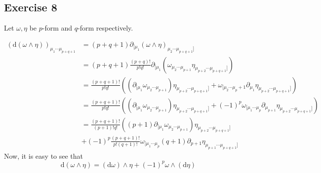 \subsection{Exercise 8}
Let $\omega,\eta$ be $p$-form and $q$-form respectively.

\begin{align}
    (\mathrm{d}(\omega \wedge \eta))_{\mu_1 \cdots \mu_{p+q+1}} &= (p+q+1)\partial_{[\mu_1} (\omega \wedge \eta)_{\mu_2\cdots\mu_{p+q+1}]} \\
    &= (p+q+1) \frac{(p+q)!}{p!q!}\partial_{[\mu_1} (\omega_{\mu_2\cdots \mu_{p+1}} \eta_{\mu_{p+2}\cdots\mu_{p+q+1}]}) \\
    &= \frac{(p+q+1)!}{p!q!}\left((\partial_{[\mu_1}\omega_{\mu_2\cdots \mu_{p+1}})\eta_{\mu_{p+2}\cdots\mu_{p+q+1}]} + \omega_{[\mu_2 \cdots \mu_p+1} \partial_{\mu_1} \eta_{\mu_{p+2} \cdots \mu_{p+q+1}]}\right) \\
    &= \frac{(p+q+1)!}{p!q!}\left((\partial_{[\mu_1}\omega_{\mu_2\cdots \mu_{p+1}})\eta_{\mu_{p+2}\cdots\mu_{p+q+1}]} + (-1)^p \omega_{[\mu_1 \cdots \mu_p} \partial_{\mu_{p+1}} \eta_{\mu_{p+2} \cdots \mu_{p+q+1}]}\right) \\
    &= \frac{(p+q+1)!}{(p+1)!q!} ((p+1)\partial_{[\mu_1}\omega_{\mu_2\cdots \mu_{p+1}})\eta_{\mu_{p+2}\cdots\mu_{p+q+1}]} \\
    &+ (-1)^p \frac{(p+q+1)!}{p!(q+1)!} \omega_{[\mu_1 \cdots \mu_p} (q+1)\partial_{p+1}\eta_{\mu_{p+1}\cdots\mu_{p+q+1}]}
\end{align}
Now, it is easy to see that
\begin{equation}
    \mathrm{d}(\omega\wedge\eta) = (\mathrm{d}\omega)\wedge\eta + (-1)^p\omega\wedge(\mathrm{d}\eta)
\end{equation}